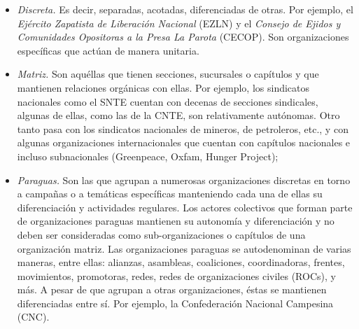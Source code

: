\documentclass[letterpaper, 11pt]{book}
\theoremstyle{definition}
\theoremstyle{remark}
\begin{document}
\begin{description}
\begin{itemize}
        \item \emph{Discreta.} Es decir, separadas, acotadas, diferenciadas de otras. 
        Por ejemplo, el \emph{Ejército Zapatista de Liberación Nacional} (EZLN) y el \emph{Consejo de Ejidos y Comunidades Opositoras a la Presa La Parota} (CECOP). 
        Son organizaciones específicas que actúan de manera unitaria.
        
        \item \emph{Matriz.} Son aquéllas que tienen secciones, sucursales o capítulos y que mantienen relaciones orgánicas con ellas. 
        Por ejemplo, los sindicatos nacionales como el SNTE cuentan con decenas de secciones sindicales, algunas de ellas, como las de la CNTE, son relativamente autónomas. 
        Otro tanto pasa con los sindicatos nacionales de mineros, de petroleros, etc., y con algunas organizaciones internacionales que cuentan con capítulos nacionales e incluso subnacionales (Greenpeace, Oxfam, Hunger Project);
        
        \item \emph{Paraguas.} 
        Son las que agrupan a numerosas organizaciones discretas en torno a campañas o a temáticas específicas manteniendo cada una de ellas su diferenciación y actividades regulares. 
        Los actores colectivos que forman parte de organizaciones paraguas mantienen su autonomía y diferenciación y no deben ser consideradas como sub-organizaciones o capítulos de una organización matriz. 
        Las organizaciones paraguas se autodenominan de varias maneras, entre ellas: alianzas, asambleas, coaliciones, coordinadoras, frentes, movimientos, promotoras, redes, redes de organizaciones civiles (ROCs), y más. 
        A pesar de que agrupan a otras organizaciones, éstas se mantienen diferenciadas entre sí. 
        Por ejemplo, la Confederación Nacional Campesina (CNC). 
        

\end{itemize}
\end{description}
\end{document}
